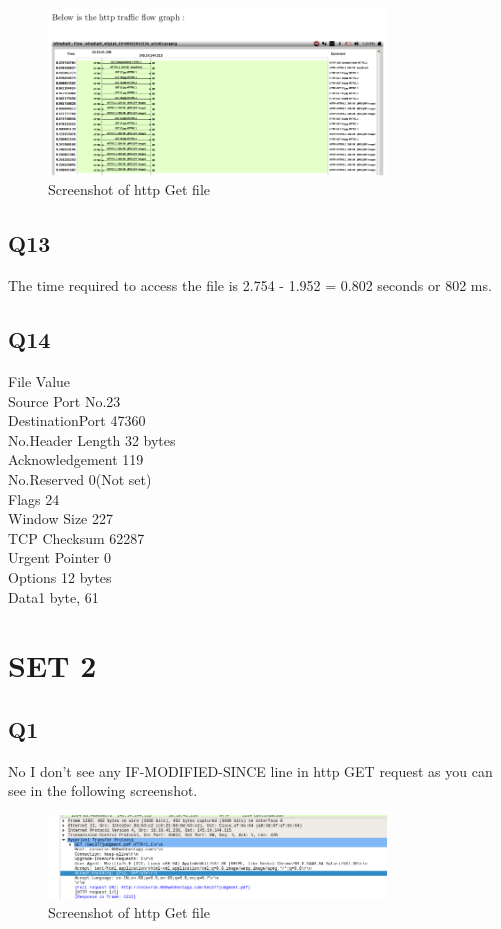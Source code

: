 \documentclass{article}
\begin{document}
   \begin{figure}[H]
 \centering
 \includegraphics[width=0.8\textwidth]{../Set1/q12/b.png}
 \caption{\label{fig:PING}Screenshot of http Get file}
 \end{figure}
\subsection{Q13}
The time required to access the file is 2.754 - 1.952 = 0.802 seconds or 802 ms.\\
\subsection{Q14}
File              Value\\
Source Port No.23\\
DestinationPort 47360\\
No.Header Length 32 bytes\\
Acknowledgement 119\\
No.Reserved  0(Not set)\\
Flags 24\\
Window Size  227\\
TCP Checksum 62287\\
Urgent Pointer 0\\
Options 12 bytes\\
Data1 byte, 61\\
\section{SET 2}

\subsection{Q1}
No I don’t see any IF-MODIFIED-SINCE line in http GET request as you can see in the following screenshot.\\
  \begin{figure}[H]
 \centering
 \includegraphics[width=0.8\textwidth]{../Set2/q1/a.png}
 \caption{\label{fig:PING}Screenshot of http Get file}
 \end{figure}
\end{document}
